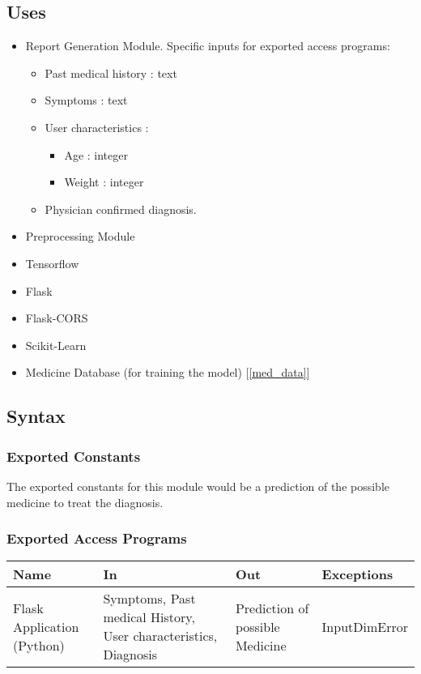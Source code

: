 \documentclass[12pt, titlepage]{article}
\begin{document}
\subsection{Uses}
\begin{itemize}
  \item Report Generation Module. Specific inputs for exported access programs:
    \begin{itemize}
      \item Past medical history : text
      \item Symptoms : text
      \item User characteristics :
        \begin{itemize}
          \item Age : integer
          \item Weight : integer
        \end{itemize}
      \item Physician confirmed diagnosis.
    \end{itemize}
  \item Preprocessing Module
  \item Tensorflow
  \item Flask
  \item Flask-CORS
  \item Scikit-Learn
  \item Medicine Database (for training the model) [\ref{med_data}]

\end{itemize}

\subsection{Syntax}

\subsubsection{Exported Constants}
The exported constants for this module would be a prediction of the possible medicine to treat the diagnosis.

\subsubsection{Exported Access Programs}

\begin{center}
\begin{tabular}{p{2cm} p{4cm} p{4cm} p{2cm}}
\hline
\textbf{Name} & \textbf{In} & \textbf{Out} & \textbf{Exceptions} \\
\hline
Flask Application (Python) & Symptoms, Past medical History, User characteristics, Diagnosis & Prediction of possible Medicine & InputDimError \\
\hline
\end{tabular}
\end{center}
\end{document}
